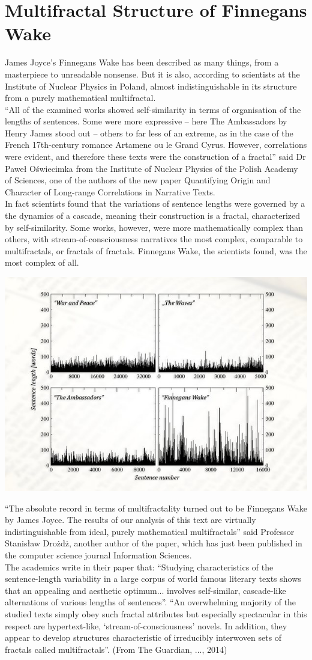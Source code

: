 \documentclass[10pt]{report}
\begin{document}
		\section{Multifractal Structure of Finnegans Wake}
			James Joyce's Finnegans Wake has been described as many things, from a masterpiece to unreadable nonsense. But it is also, according to scientists at the Institute of Nuclear Physics in Poland, almost indistinguishable in its structure from a purely mathematical multifractal.\\
			``All of the examined works showed self-similarity in terms of organisation of the lengths of sentences. Some were more expressive – here The Ambassadors by Henry James stood out – others to far less of an extreme, as in the case of the French 17th-century romance Artamene ou le Grand Cyrus. However, correlations were evident, and therefore these texts were the construction of a fractal'' said Dr Paweł Oświecimka from the Institute of Nuclear Physics of the Polish Academy of Sciences, one of the authors of the new paper Quantifying Origin and Character of Long-range Correlations in Narrative Texts.\\
			In fact  scientists found that the variations of sentence lengths were governed by a the dynamics of a cascade, meaning their construction is a fractal, characterized by self-similarity. Some works, however, were more mathematically complex than others, with stream-of-consciousness narratives the most complex, comparable to multifractals, or fractals of fractals. Finnegans Wake, the scientists found, was the most complex of all.
			\begin{center}
				\includegraphics[width=0.5\linewidth]{"Inglese - Joyce/fractal_graphic"}
			\end{center}
			``The absolute record in terms of multifractality turned out to be Finnegans Wake by James Joyce. The results of our analysis of this text are virtually indistinguishable from ideal, purely mathematical multifractals'' said Professor Stanisław Drożdż, another author of the paper, which has just been published in the computer science journal Information Sciences.\\
			The academics write in their paper that: ``Studying characteristics of the sentence-length variability in a large corpus of world famous literary texts shows that an appealing and aesthetic optimum... involves self-similar, cascade-like alternations of various lengths of sentences''. ``An overwhelming majority of the studied texts simply obey such fractal attributes but especially spectacular in this respect are hypertext-like, ‘stream-of-consciousness’ novels. In addition, they appear to develop structures characteristic of irreducibly interwoven sets of fractals called multifractals''. (From The Guardian, ..., 2014)
			
\end{document}
